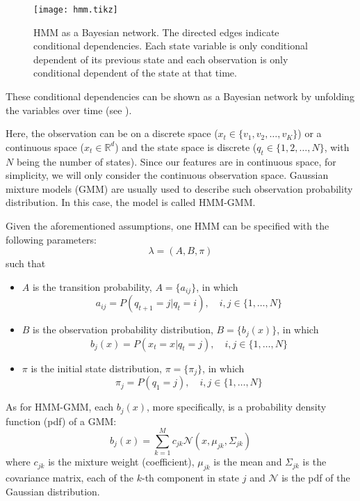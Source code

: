 \documentclass[12pt,final,twoside]{report}
\begin{document}
\begin{figure}[t]
  \centering
  \texttt{[image: hmm.tikz]}
  \caption[HMM as a Bayesian network.]{HMM as a Bayesian network. The directed edges indicate conditional dependencies. Each state variable is only conditional dependent of its previous state and each observation is only conditional dependent of the state at that time.}
  \label{fig:hmm}
\end{figure}

These conditional dependencies can be shown as a Bayesian network by unfolding the variables over time (see ).

Here, the observation can be on a discrete space ($x_t \in \{v_1, v_2, \dots, v_K\}$) or a continuous space ($x_t \in \mathbb{R}^d$) and the state space is discrete ($q_t \in \{1, 2, \dots, N\}$, with $N$ being the number of states). Since our features are in continuous space, for simplicity, we will only consider the continuous observation space. Gaussian mixture models (GMM) are usually used to describe such observation probability distribution. In this case, the model is called HMM-GMM.

Given the aforementioned assumptions, one HMM can be specified with the following parameters:
\[ \lambda = (A, B, \pi) \]
such that
\begin{itemize}
  \item $A$ is the transition probability, $A = \{a_{ij}\}$, in which 
    \[ a_{ij} = P(q_{t+1} = j | q_t = i), \quad i,j \in \{1, \dots, N\} \]
  \item $B$ is the observation probability distribution, $B = \{b_j(x)\}$, in which
    \[ b_j(x) = P(x_t = x | q_t = j), \quad i,j \in \{1, \dots, N\} \]
  \item $\pi$ is the initial state distribution, $\pi = \{\pi_j\}$, in which
    \[ \pi_j = P(q_1 = j), \quad i,j \in \{1, \dots, N\} \]
\end{itemize}

As for HMM-GMM, each $b_j(x)$, more specifically, is a probability density function (pdf) of a GMM:
\[ b_j(x) = \sum_{k=1}^M c_{jk} \mathcal{N}(x, \mu_{jk}, \Sigma_{jk}) \]
where $c_{jk}$ is the mixture weight (coefficient), $\mu_{jk}$ is the mean and $\Sigma_{jk}$ is the covariance matrix, each of the $k$-th component in state $j$ and $\mathcal{N}$ is the pdf of the Gaussian distribution. 
\end{document}
